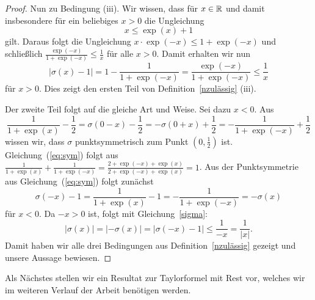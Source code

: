 \begin{proof}
Nun zu Bedingung (iii). Wir wissen, dass für $x \in \mathbb{R}$ und damit insbesondere für ein beliebiges $x > 0$ die Ungleichung $$ x \leq \exp(x) + 1$$ gilt.
Daraus folgt die Ungleichung $x \cdot \exp(-x) \leq 1 + \exp(-x)$ und schließlich $\frac{\exp(-x)}{1 + \exp(-x)} \leq \frac{1}{x}$ für alle $x > 0$. Damit erhalten wir nun
\begin{equation}
\label{sigma}
|\sigma(x) - 1| = 1 - \frac{1}{1 + \exp(-x)} = \frac{\exp(-x)}{1 + \exp(-x)} \leq \frac{1}{x}
\end{equation}
für $x > 0$.
Dies zeigt den ersten Teil von Definition~\ref{nzulässig} (iii).

Der zweite Teil folgt auf die gleiche Art und Weise. Sei dazu $x < 0$. Aus
\begin{equation}
\label{eq:sym}
\frac{1}{1 + \exp(x)} - \frac{1}{2}= \sigma(0 - x) - \frac{1}{2} = -\sigma(0 + x) + \frac{1}{2} = -\frac{1}{1 + \exp(-x)} + \frac{1}{2}
\end{equation}
wissen wir, dass $\sigma$ punktsymmetrisch zum Punkt $(0, \frac{1}{2})$ ist. 
Gleichung~(\ref{eq:sym}) folgt aus $\frac{1}{1 + \exp(x)} + \frac{1}{1 + \exp(-x)} = \frac{2 + \exp(-x) + \exp(x)}{2 + \exp(-x) + \exp(x)} = 1$.
Aus der Punktsymmetrie aus Gleichung~(\ref{eq:sym}) folgt zunächst $$\sigma(- x) - 1 = \frac{1}{1 + \exp(x)} - 1 = -\frac{1}{1 + \exp(-x)} = -\sigma(x)$$ für $x < 0$. Da $-x > 0$ ist, folgt mit Gleichung~\eqref{sigma}:  
$$|\sigma(x)| = |-\sigma(x)| = |\sigma(- x) - 1| \leq \frac{1}{-x} = \frac{1}{|x|}.$$
Damit haben wir alle drei Bedingungen aus Definition~\ref{nzulässig} gezeigt und unsere Aussage bewiesen.
\end{proof}
Als Nächstes stellen wir ein Resultat zur Taylorformel mit Rest vor, welches wir im weiteren Verlauf der Arbeit benötigen werden.

